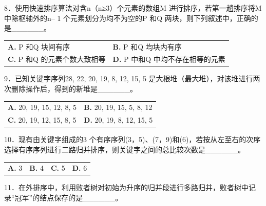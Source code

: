 \documentclass[UTF8,11pt]{ctexart}
\begin{document}
8．使用快速排序算法对含n（n≥3）个元素的数组M 进行排序，若第一趟排序将M 中除枢轴外的n– 1 个元素划分为均不为空的P 和Q 两块，则下列叙述中，正确的是\_\_\_\_\_\_。


\begin{center}\begin{tabular}{>{\raggedright\arraybackslash}p{\dimexpr(\linewidth-4\tabcolsep)/2\relax}>{\raggedright\arraybackslash}p{\dimexpr(\linewidth-4\tabcolsep)/2\relax}}
\textbf{A.} P 和Q 块间有序 & \textbf{B.} P 和Q 均块内有序\\[.35em]
\textbf{C.} P 和Q 的元素个数大致相等 & \textbf{D.} P 中和Q 中均不存在相等的元素\\[.35em]\end{tabular}\end{center}

9．已知关键字序列28, 22, 20, 19, 8, 12, 15, 5 是大根堆（最大堆），对该堆进行两次删除操作后，得到的新堆是\_\_\_\_\_\_。


\begin{center}\begin{tabular}{>{\raggedright\arraybackslash}p{\dimexpr(\linewidth-4\tabcolsep)/2\relax}>{\raggedright\arraybackslash}p{\dimexpr(\linewidth-4\tabcolsep)/2\relax}}
\textbf{A.} 20, 19, 15, 12, 8, 5 & \textbf{B.} 20, 19, 15, 5, 8, 12\\[.35em]
\textbf{C.} 20, 19, 12, 15, 8, 5 & \textbf{D.} 20, 19, 8, 12, 15, 5\\[.35em]\end{tabular}\end{center}

10．现有由关键字组成的3 个有序序列(3，5)、(7，9)和(6)，若按从左至右的次序选择有序序列进行二路归并排序，则关键字之间的总比较次数是\_\_\_\_\_\_。


\begin{center}\begin{tabular}{>{\raggedright\arraybackslash}p{\dimexpr(\linewidth-8\tabcolsep)/4\relax}>{\raggedright\arraybackslash}p{\dimexpr(\linewidth-8\tabcolsep)/4\relax}>{\raggedright\arraybackslash}p{\dimexpr(\linewidth-8\tabcolsep)/4\relax}>{\raggedright\arraybackslash}p{\dimexpr(\linewidth-8\tabcolsep)/4\relax}}
\textbf{A.} 3 & \textbf{B.} 4 & \textbf{C.} 5 & \textbf{D.} 6\\[.35em]\end{tabular}\end{center}

11．在外排序中，利用败者树对初始为升序的归并段进行多路归并，败者树中记录“冠军”的结点保存的是\_\_\_\_\_\_。
\end{document}
